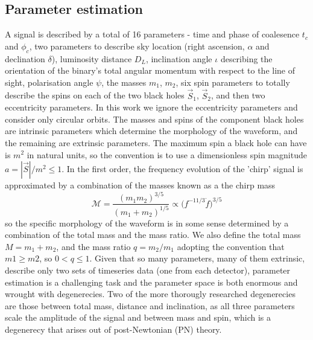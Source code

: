 \documentclass[11pt]{article}
\begin{document}
\subsection{Parameter estimation}
A signal is described by a total of 16 parameters\cite{props} - time and phase of coalesence $t_c$ and $\phi_c$, two parameters to describe sky location (right ascension, $\alpha$ and declination $\delta$), luminosity distance $D_L$, inclination angle $\iota$ describing the orientation of the binary's total angular momentum with respect to the line of sight, polarisation angle $\psi$, the masses $m_1$, $m_2$, six spin parameters to totally describe the spins on each of the two black holes $\vec{S}_1$, $\vec{S}_2$, and then two eccentricity parameters. In this work we ignore the eccentricity parameters and consider only circular orbits. The masses and spins of the component black holes are intrinsic parameters which determine the morphology of the waveform, and the remaining are extrinsic parameters. The maximum spin a black hole can have is $m^2$ in natural units, so the convention is to use a dimensionless spin magnitude $a=|\vec{S}|/m^2 \leq 1$. In the first order, the frequency evolution of the 'chirp' signal is approximated by a combination of the masses known as a the chirp mass
\begin{equation}
\mathcal{M}=\frac{(m_1m_2)^{3/5}}{(m_1+m_2)^{1/5}}\propto \bigg(f^{-11/3}\dot{f}\bigg)^{3/5}
\end{equation}
so the specific morphology of the waveform is in some sense determined by a combination of the total mass and the mass ratio. We also define the total mass $M=m_1+m_2$, and the mass ratio $q=m_2/m_1$ adopting the convention that $m1\geq m2$, so $0<q\leq1$.
Given that so many parameters, many of them extrinsic, describe only two sets of timeseries data (one from each detector), parameter estimation is a challenging task and the parameter space is both enormous and wrought with degenerecies. Two of the more thorougly researched degenerecies are those between total mass, distance and inclination, as all three parameters scale the amplitude of the signal and between mass and spin\cite{spindegen}, which is a degenerecy that arises out of post-Newtonian (PN) theory. 
\end{document}
